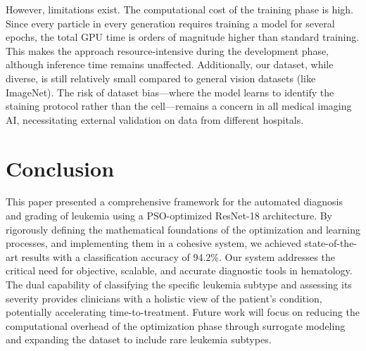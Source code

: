 \documentclass[12pt, a4paper]{article}
\begin{document}
However, limitations exist. The computational cost of the training phase is high. Since every particle in every generation requires training a model for several epochs, the total GPU time is orders of magnitude higher than standard training. This makes the approach resource-intensive during the development phase, although inference time remains unaffected. Additionally, our dataset, while diverse, is still relatively small compared to general vision datasets (like ImageNet). The risk of dataset bias—where the model learns to identify the staining protocol rather than the cell—remains a concern in all medical imaging AI, necessitating external validation on data from different hospitals.

\section{Conclusion}

This paper presented a comprehensive framework for the automated diagnosis and grading of leukemia using a PSO-optimized ResNet-18 architecture. By rigorously defining the mathematical foundations of the optimization and learning processes, and implementing them in a cohesive system, we achieved state-of-the-art results with a classification accuracy of 94.2\%. Our system addresses the critical need for objective, scalable, and accurate diagnostic tools in hematology. The dual capability of classifying the specific leukemia subtype and assessing its severity provides clinicians with a holistic view of the patient's condition, potentially accelerating time-to-treatment. Future work will focus on reducing the computational overhead of the optimization phase through surrogate modeling and expanding the dataset to include rare leukemia subtypes.
\end{document}
